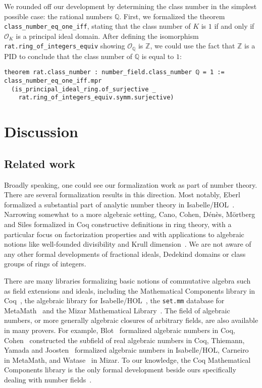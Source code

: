 \documentclass[sn-mathphys]{sn-jnl}%
\newcommand{\lean}[1]{\texttt{#1}\xspace}
\newcommand*{\OK}[1][K]{\mathcal{O}_{#1}}
\newcommand{\QQ}{\mathbb{Q}}
\renewcommand{\Z}{\mathbb{Z}}
\begin{document}
We rounded off our development by determining the class number in the simplest possible case: the rational numbers $\QQ$.
First, we formalized the theorem \lean{class\_number\_eq\_one\_iff}, stating that the class number of $K$ is $1$ if and only if $\OK$ is a principal ideal domain.
After defining the isomorphism \lean{rat.ring\_of\_integers\_equiv} showing $\OK[\QQ]$ is $\Z$,
we could use the fact that $\Z$ is a PID to conclude that the class number of $\QQ$ is equal to $1$:
\begin{lstlisting}
theorem rat.class_number : number_field.class_number ℚ = 1 :=
class_number_eq_one_iff.mpr
  (is_principal_ideal_ring.of_surjective _
    rat.ring_of_integers_equiv.symm.surjective)
\end{lstlisting}

\section{Discussion}

\subsection{Related work}

Broadly speaking, one could see our formalization work as part of number theory. There are several formalization results in this direction.
Most notably, Eberl formalized a substantial part of analytic number theory in Isabelle/HOL~\cite{Eberl19}.
Narrowing somewhat to a more algebraic setting,
Cano, Cohen, Dénès, Mörtberg and Siles formalized in Coq constructive definitions in ring theory, with a particular focus on factorization properties and with applications to algebraic notions like well-founded divisibility and Krull dimension~\cite{linear-algebra-coq}.
We are not aware of any other formal developments of fractional ideals, Dedekind domains or class groups of rings of integers.

There are many libraries formalizing basic notions of commutative algebra such as field extensions and ideals, including the Mathematical Components library in Coq~\cite{mathcomp},
the algebraic library for Isabelle/HOL~\cite{algebra_isabelle},
the \texttt{set.mm} database for MetaMath~\cite{metamath} and the Mizar Mathematical Library~\cite{algebraic-hierarchy_mizar}.
The field of algebraic numbers, or more generally algebraic closures of arbitrary fields, are also available in many provers.
For example, Blot~\cite{algebraic-numbers-ccorn} formalized algebraic numbers in Coq,
Cohen~\cite{real-algebraic-numbers-coq} constructed the subfield of real algebraic numbers in Coq,
Thiemann, Yamada and Joosten~\cite{algebraic-numbers-isabelle} formalized algebraic numbers in Isabelle/HOL,
Carneiro~\cite{algebraic-numbers-metamath} in MetaMath,
and Watase~\cite{algebraic-numbers-mizar} in Mizar.
To our knowledge, the Coq Mathematical Components library is the only formal development beside ours specifically dealing with number fields~\cite[\texttt{field/algnum.v}]{mathcomp}.
\end{document}
